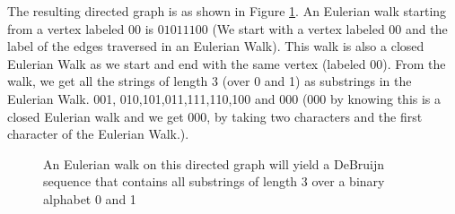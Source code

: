 The resulting directed graph is as shown in Figure \ref{4g6}. An Eulerian walk starting from a vertex labeled 00 is $0 1 0 1 1 1 0 0$  (We start with a vertex labeled 00 and the label of the edges traversed in an Eulerian Walk). This walk is also a closed Eulerian Walk as we start and end with the same vertex (labeled $00$).
From the walk, we get all the strings of length 3 (over 0 and 1) as substrings in the Eulerian Walk.
001, 010,101,011,111,110,100 and 000 (000 by knowing this is a closed Eulerian walk and we get 000, by taking two characters and the first character of the Eulerian Walk.).\\
\vspace{0.2in}
\begin{figure}
\begin{center}
\caption{ An Eulerian walk on this directed graph will yield a DeBruijn sequence that contains all substrings of length 3 over a binary alphabet 0 and 1}\label{4g6}
\end{center}
\end{figure}

